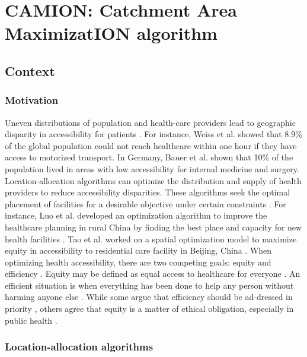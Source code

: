 \chapter{CAMION: Catchment Area MaximizatION algorithm}

\section{Context}

\subsection{Motivation}

Uneven distributions of population and health-care providers lead to geographic disparity in accessibility for patients \cite{wang_why_2020}. For instance, Weiss et al. \cite{weiss_global_2020} showed that 8.9\% of the global population could not reach healthcare within one hour if they have access to motorized transport. In Germany, Bauer et al. \cite{bauer_spatial_2020} shown that 10\% of the population lived in areas with low accessibility for internal medicine and surgery. Location-allocation algorithms \cite{church_location_1999} can optimize the distribution and supply of health providers to reduce accessibility disparities. These algorithms seek the optimal placement of facilities for a desirable objective under certain constraints \cite{wang_measurement_2012}. For instance, Luo et al. developed an optimization algorithm to improve the healthcare planning in rural China by finding the best place and capacity for new health facilities \cite{luo_integrating_2014}. Tao et al. worked on a spatial optimization model to maximize equity in accessibility to residential care facility in Beijing, China \cite{tao_spatial_2014}. When optimizing health accessibility, there are two competing goals: equity and efficiency \cite{krugman_opinion_2013,meyer_equity_2008}. Equity may be defined as equal access to healthcare for everyone \cite{culyer_equity_1993}. An efficient situation is when everything has been done to help any person without harming anyone else \cite{hemenway_optimal_1982}. While some argue that efficiency should be ad-dressed in priority \cite{hemenway_optimal_1982}, others agree that equity is a matter of ethical obligation, especially in public health \cite{fried_rights_1975, oliver_equity_2004}.

\subsection{Location-allocation algorithms}

